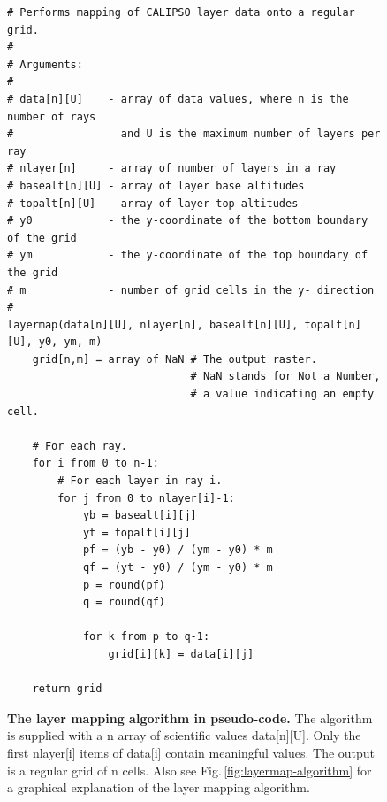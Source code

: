 \begin{figure}[h]

\begin{lstlisting}
# Performs mapping of CALIPSO layer data onto a regular grid.
#
# Arguments:
#
# data[n][U]    - array of data values, where n is the number of rays
#                 and U is the maximum number of layers per ray
# nlayer[n]     - array of number of layers in a ray
# basealt[n][U] - array of layer base altitudes
# topalt[n][U]  - array of layer top altitudes
# y0            - the y-coordinate of the bottom boundary of the grid
# ym            - the y-coordinate of the top boundary of the grid
# m             - number of grid cells in the y- direction
#
layermap(data[n][U], nlayer[n], basealt[n][U], topalt[n][U], y0, ym, m)
    grid[n,m] = array of NaN # The output raster.
                             # NaN stands for Not a Number,
                             # a value indicating an empty cell.

    # For each ray.
    for i from 0 to n-1:
        # For each layer in ray i.
        for j from 0 to nlayer[i]-1:
            yb = basealt[i][j]
            yt = topalt[i][j]
            pf = (yb - y0) / (ym - y0) * m
            qf = (yt - y0) / (ym - y0) * m
            p = round(pf)
            q = round(qf)
            
            for k from p to q-1:
                grid[i][k] = data[i][j]

    return grid
\end{lstlisting}
\caption[The layer mapping algorithm in pseudo-code]{\textbf{The layer mapping algorithm in pseudo-code.}
The algorithm is supplied with a n array of scientific values
data[n][U].
Only the first nlayer[i] items of data[i] contain meaningful values.
The output is a regular grid of n cells.
Also see Fig.\,\ref{fig:layermap-algorithm} for a graphical explanation of the
layer mapping algorithm.}
\label{fig:layermap-algorithm-pseudocode}
\end{figure}

